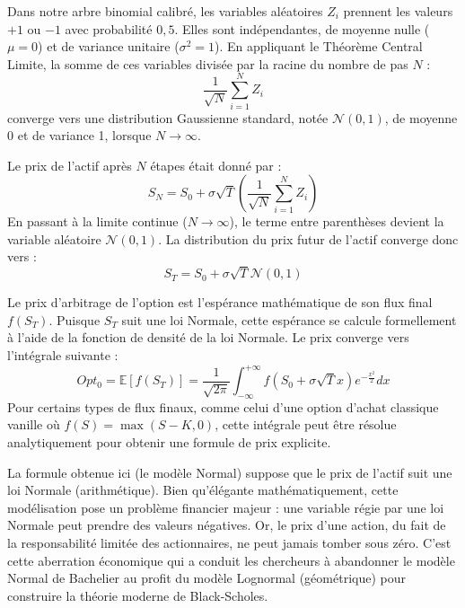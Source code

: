 Dans notre arbre binomial calibré, les variables aléatoires $Z_i$ prennent les valeurs $+1$ ou $-1$ avec probabilité $0,5$. Elles sont indépendantes, de moyenne nulle ($\mu = 0$) et de variance unitaire ($\sigma^2 = 1$). En appliquant le Théorème Central Limite, la somme de ces variables divisée par la racine du nombre de pas $N$ :
\begin{equation}
    \label{eq:fsec3-tcl_app}
    \frac{1}{\sqrt{N}} \sum_{i=1}^{N} Z_i
\end{equation}
converge vers une distribution Gaussienne standard, notée $\mathcal{N}(0,1)$, de moyenne 0 et de variance 1, lorsque $N \to \infty$.

Le prix de l'actif après $N$ étapes était donné par :
\begin{equation}
    \label{eq:fsec3-sn_limite}
    S_N = S_0 + \sigma \sqrt{T} \left( \frac{1}{\sqrt{N}} \sum_{i=1}^{N} Z_i \right)
\end{equation}
En passant à la limite continue ($N \to \infty$), le terme entre parenthèses devient la variable aléatoire $\mathcal{N}(0,1)$. La distribution du prix futur de l'actif converge donc vers :
\begin{equation}
    \label{eq:fsec3-st_continu}
    S_T = S_0 + \sigma \sqrt{T} \mathcal{N}(0,1)
\end{equation}

Le prix d'arbitrage de l'option est l'espérance mathématique de son flux final $f(S_T)$. Puisque $S_T$ suit une loi Normale, cette espérance se calcule formellement à l'aide de la fonction de densité de la loi Normale.
Le prix converge vers l'intégrale suivante :
\begin{equation}
    \label{eq:fsec3-integrale_continue}
    Opt_0 = \mathbb{E}[f(S_T)] = \frac{1}{\sqrt{2\pi}} \int_{-\infty}^{+\infty} f(S_0 + \sigma \sqrt{T} x) e^{-\frac{x^2}{2}} dx
\end{equation}
Pour certains types de flux finaux, comme celui d'une option d'achat classique vanille où $f(S) = \max(S - K, 0)$, cette intégrale peut être résolue analytiquement pour obtenir une formule de prix explicite.

La formule obtenue ici (le modèle Normal) suppose que le prix de l'actif suit une loi Normale (arithmétique). Bien qu'élégante mathématiquement, cette modélisation pose un problème financier majeur : une variable régie par une loi Normale peut prendre des valeurs négatives. Or, le prix d'une action, du fait de la responsabilité limitée des actionnaires, ne peut jamais tomber sous zéro. C'est cette aberration économique qui a conduit les chercheurs à abandonner le modèle Normal de Bachelier au profit du modèle Lognormal (géométrique) pour construire la théorie moderne de Black-Scholes.